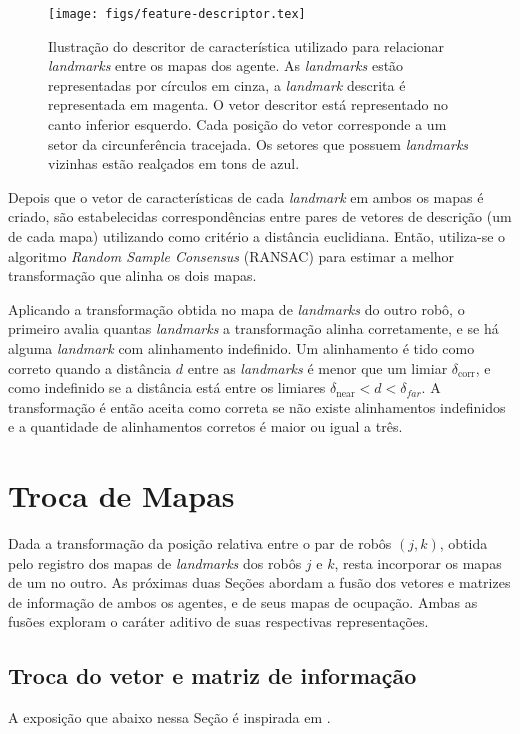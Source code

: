 \begin{figure}[h]
  \centering
  \texttt{[image: figs/feature-descriptor.tex]}
  \caption{Ilustração do descritor de característica utilizado para 
  relacionar \textit{landmarks} entre os mapas dos agente. As \textit{landmarks} estão representadas por círculos em cinza, a \textit{landmark} descrita é representada em magenta. O vetor descritor está representado no canto inferior esquerdo. Cada posição do vetor corresponde a um setor da circunferência tracejada. Os setores que 
  possuem \textit{landmarks} vizinhas estão realçados em tons de azul.}
  \label{fig:feature-descriptor}
\end{figure}

Depois que o vetor de características de cada \textit{landmark} em ambos os 
mapas é criado, são estabelecidas correspondências entre pares de vetores de descrição (um de cada mapa) utilizando 
como critério a distância euclidiana. 
Então, utiliza-se o algoritmo \textit{Random Sample Consensus} (RANSAC) 
\cite{fischler1981random} para estimar a melhor transformação que alinha 
os dois mapas.

Aplicando a transformação obtida no mapa de \textit{landmarks} do outro 
robô, o primeiro avalia quantas \textit{landmarks} a transformação alinha 
corretamente, e se há alguma \textit{landmark} com alinhamento indefinido. 
Um alinhamento é tido como correto quando a distância $d$ entre as 
\textit{landmarks} é menor que um limiar $\delta_{\text{corr}}$, e como 
indefinido se a distância está entre os limiares 
$\delta_{\text{near}} < d < \delta_{far}$. A transformação é então aceita 
como correta se não existe alinhamentos indefinidos e a quantidade de 
alinhamentos corretos é maior ou igual a três.


\section{Troca de Mapas}
\label{sec:seif-map-exchange}

Dada a transformação da posição relativa entre o par de robôs $(j, k)$, 
obtida pelo registro dos mapas de \textit{landmarks} dos robôs $j$ e 
$k$, resta incorporar os mapas de um no outro. As próximas duas Seções abordam 
a fusão dos vetores e matrizes de informação de ambos os agentes, e de seus 
mapas de ocupação. Ambas as fusões exploram o caráter aditivo de suas 
respectivas representações.

\subsection{Troca do vetor e matriz de informação}
A exposição que abaixo nessa Seção é inspirada em \cite[Seção~12.11]{bongard2006probabilistic}. 

